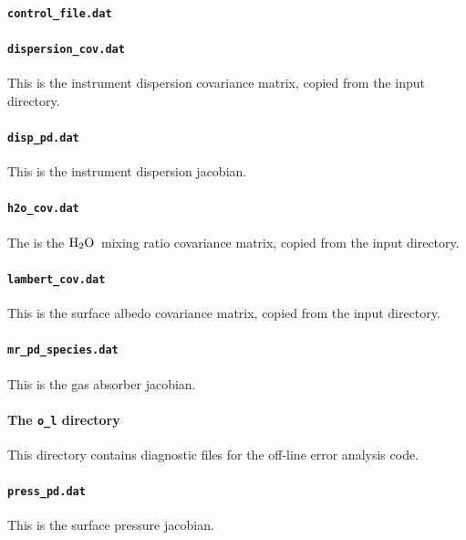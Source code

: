 \documentclass{article}
\newcommand{\HtwoO}{\ensuremath{\rm{H}_2\rm{O}}}
\begin{document}
\paragraph{\texttt{control\_file.dat}}
\paragraph{\texttt{dispersion\_cov.dat}}

This is the instrument dispersion covariance matrix, copied from the
input directory.

\paragraph{\texttt{disp\_pd.dat}}

This is the instrument dispersion jacobian.

\paragraph{\texttt{h2o\_cov.dat}}

The is the \HtwoO\ mixing ratio covariance matrix, copied from the
input directory.

\paragraph{\texttt{lambert\_cov.dat}}

This is the surface albedo covariance matrix, copied from the
input directory.

\paragraph{\texttt{mr\_pd\_species.dat}}

This is the gas absorber jacobian.

\paragraph{The \texttt{o\_l} directory}

This directory contains diagnostic files for the off-line error
analysis code.

\paragraph{\texttt{press\_pd.dat}}

This is the surface pressure jacobian.
\end{document}
